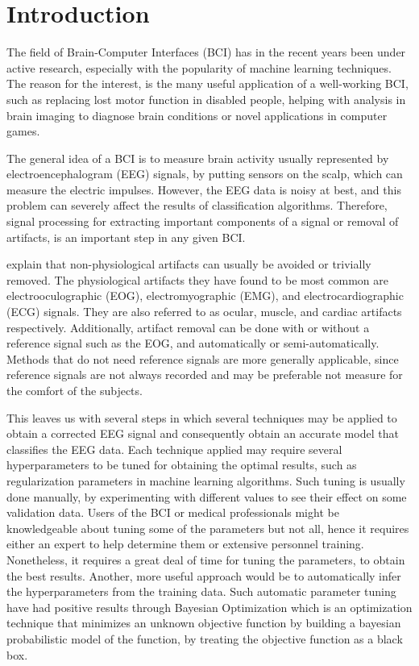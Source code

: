 \section{Introduction}
The field of Brain-Computer Interfaces (BCI) has in the recent years been under active research, especially with the popularity of machine learning techniques. The reason for the interest, is the many useful application of a well-working BCI, such as replacing lost motor function in disabled people, helping with analysis in brain imaging to diagnose brain conditions or novel applications in computer games. 

The general idea of a BCI is to measure brain activity usually represented by electroencephalogram (EEG) signals, by putting sensors on the scalp, which can measure the electric impulses. However, the EEG data is noisy at best, and this problem can severely affect the results of classification algorithms. Therefore, signal processing for extracting important components of a signal or removal of artifacts, is an important step in any given BCI.

\cite{uriguen2015eeg} explain that non-physiological artifacts can usually be avoided or trivially removed. The physiological artifacts they have found to be most common are electrooculographic (EOG), electromyographic (EMG), and electrocardiographic (ECG) signals. They are also referred to as ocular, muscle, and cardiac artifacts respectively. Additionally, artifact removal can be done with or without a reference signal such as the EOG, and automatically or semi-automatically. Methods that do not need reference signals are more generally applicable, since reference signals are not always recorded and may be preferable not measure for the comfort of the subjects. 

This leaves us with several steps in which several techniques may be applied to obtain a corrected EEG signal and consequently obtain an accurate model that classifies the EEG data. Each technique applied may require several hyperparameters to be tuned for obtaining the optimal results, such as regularization parameters in machine learning algorithms. Such tuning is usually done manually, by experimenting with different values to see their effect on some validation data. Users of the BCI or medical professionals might be knowledgeable about tuning some of the parameters but not all, hence it requires either an expert to help determine them or extensive personnel training. Nonetheless, it requires a great deal of time for tuning the parameters, to obtain the best results. Another, more useful approach would be to automatically infer the hyperparameters from the training data. Such automatic parameter tuning have had positive results through Bayesian Optimization \citep{brochu2010tutorial,snoek2012practical,shahriari2016taking} which is an optimization technique that minimizes an unknown objective function by building a bayesian probabilistic model of the function, by treating the objective function as a black box.


